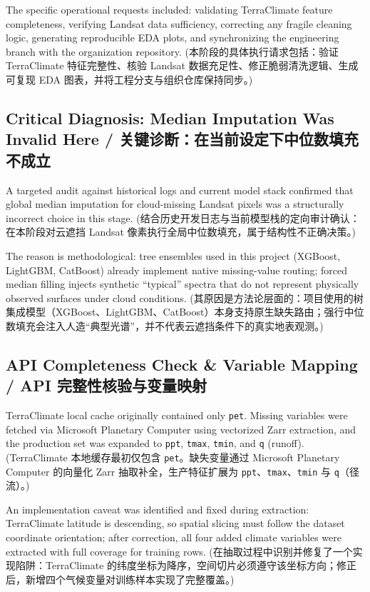 The specific operational requests included: validating TerraClimate feature completeness, verifying Landsat data sufficiency, correcting any fragile cleaning logic, generating reproducible EDA plots, and synchronizing the engineering branch with the organization repository.
(本阶段的具体执行请求包括：验证 TerraClimate 特征完整性、核验 Landsat 数据充足性、修正脆弱清洗逻辑、生成可复现 EDA 图表，并将工程分支与组织仓库保持同步。)

\subsection{Critical Diagnosis: Median Imputation Was Invalid Here / 关键诊断：在当前设定下中位数填充不成立}
A targeted audit against historical logs and current model stack confirmed that global median imputation for cloud-missing Landsat pixels was a structurally incorrect choice in this stage.
(结合历史开发日志与当前模型栈的定向审计确认：在本阶段对云遮挡 Landsat 像素执行全局中位数填充，属于结构性不正确决策。)

The reason is methodological: tree ensembles used in this project (XGBoost, LightGBM, CatBoost) already implement native missing-value routing; forced median filling injects synthetic ``typical'' spectra that do not represent physically observed surfaces under cloud conditions.
(其原因是方法论层面的：项目使用的树集成模型（XGBoost、LightGBM、CatBoost）本身支持原生缺失路由；强行中位数填充会注入人造“典型光谱”，并不代表云遮挡条件下的真实地表观测。)

\subsection{API Completeness Check \& Variable Mapping / API 完整性核验与变量映射}
TerraClimate local cache originally contained only \texttt{pet}. Missing variables were fetched via Microsoft Planetary Computer using vectorized Zarr extraction, and the production set was expanded to \texttt{ppt}, \texttt{tmax}, \texttt{tmin}, and \texttt{q} (runoff).
(TerraClimate 本地缓存最初仅包含 \texttt{pet}。缺失变量通过 Microsoft Planetary Computer 的向量化 Zarr 抽取补全，生产特征扩展为 \texttt{ppt}、\texttt{tmax}、\texttt{tmin} 与 \texttt{q}（径流）。)

An implementation caveat was identified and fixed during extraction: TerraClimate latitude is descending, so spatial slicing must follow the dataset coordinate orientation; after correction, all four added climate variables were extracted with full coverage for training rows.
(在抽取过程中识别并修复了一个实现陷阱：TerraClimate 的纬度坐标为降序，空间切片必须遵守该坐标方向；修正后，新增四个气候变量对训练样本实现了完整覆盖。)

